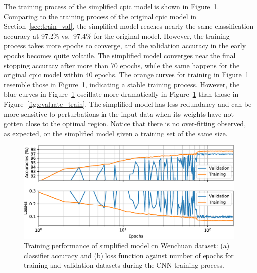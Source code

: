 \documentclass{article}
\begin{document}
The training process of the simplified \gls{cpic} model is shown in Figure~\ref{fig:train_cpicv2}.
Comparing to the training process of the original \gls{cpic} model in Section~\ref{sec:train_val}, the simplified model reaches nearly the same classification accuracy at 97.2\% vs.\ 97.4\% for the original model.
However, the training process takes more epochs to converge, and the validation accuracy in the early epochs becomes quite volatile.
The simplified model converges near the final stopping accuracy after more than 70 epochs, while the same happens for the original \gls{cpic} model within 40 epochs.
The orange curves for training in Figure~\ref{fig:train_cpicv2} resemble those in Figure~\ref{fig:train_cpicv2}, indicating a stable training process.
However, the blue curves in Figure~\ref{fig:train_cpicv2} oscillate more dramatically in Figure~\ref{fig:train_cpicv2} than those in Figure~\ref{fig:evaluate_train}.
The simplified model has less redundancy and can be more sensitive to perturbations in the input data when its weights have not gotten close to the optimal region.
Notice that there is no over-fitting observed, as expected, on the simplified model given a training set of the same size.
%
\begin{figure}
    \centering
    \includegraphics[width=\linewidth]{evaluate_train_cpicv2}
    \caption{Training performance of simplified  model on Wenchuan dataset: (a) classifier accuracy and (b) loss function against number of epochs for training and validation datasets during the CNN training process.}
    \label{fig:train_cpicv2}
\end{figure}
%
\end{document}
